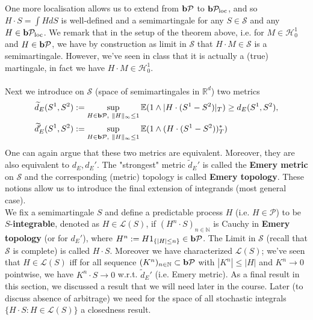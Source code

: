 \documentclass[12pt,a4paper, twoside]{article}
\theoremstyle{definition}
\newcommand{\EE}{\mathbb{E}} %
\newcommand{\pred}{\textbf{\text{b}}\mathcal{P}}
\begin{document}
\\\\
One more localisation allows us to extend from $\pred$ to $\pred_\text{loc}$, and so $H \cdot S= \int H dS$ is well-defined and a semimartingale for any $S \in \mathcal{S}$ and any $H \in \pred_\text{loc}$. We remark that in the setup of the theorem above, i.e. for $M \in \mathcal{H}_0^1$ and $H \in \pred$, we have by construction as limit in $\mathcal{S}$ that $H \cdot M \in \mathcal{S}$ is a semimartingale. However, we've seen in class that it is actually a (true) martingale, in fact we have $H \cdot M \in \mathcal{H}_0^1$. 
\\\\
Next we introduce on $\mathcal{S}$ (space of semimartingales in $\mathbb{R}^d$) two metrics
\begin{align*}
\widetilde{d}_E(S^1,S^2)&:= \sup_{H \in \pred , \ \|H\|_\infty \leq 1} \EE(1 \wedge |H \cdot (S^1-S^2)|_T) \geq d_E(S^1,S^2), \\
\widetilde{d}_E' (S^1,S^2)& := \sup_{ H \in \pred , \ \|H\|_\infty \leq1 } \EE(1 \wedge (H \cdot (S^1-S^2))_T^*) 
\end{align*}
One can again argue that these two metrics are equivalent. Moreover, they are also equivalent to $d_E, d_E'$. The "strongest" metric $\widetilde{d}_E'$ is called the \textbf{Emery metric} on $\mathcal{S}$ and the corresponding (metric) topology is called \textbf{Emery topology}. These notions allow us to introduce the final extension of integrands (most general case). 
\\
We fix a semimartingale $S$ and define a predictable process $H$ (i.e. $H \in \mathcal{P}$) to be $S$-\textbf{integrable}, denoted as $H \in \mathcal{L}(S)$, if $(H^n \cdot S)_{n \in \mathbb{N}}$ is Cauchy in \textbf{Emery topology} (or for $d_E'$), where $H^n:= H1_{\{ |H| \leq n\}} \in \pred$. The Limit in $\mathcal{S}$ (recall that $\mathcal{S}$ is complete) is called $H \cdot S$. Moreover we have characterized $\mathcal{L}(S)$; we've seen that $H \in \mathcal{L}(S)$ iff for all sequence $(K^n)_{n \in \mathbb{N}} \subset \pred$ with $|K^n| \leq |H|$ and $K^n \to 0$ pointwise, we have $K^n \cdot S \to 0$ w.r.t. $\widetilde{d}_E'$ (i.e. Emery metric). 
\newpage
As a final result in this section, we discussed a result that we will need later in the course. Later (to discuss absence of arbitrage) we need for the space of all stochastic integrals $\{H \cdot S : H \in \mathcal{L}(S)\}$ a closedness result. 
\\\\
\end{document}

